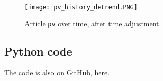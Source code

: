 \documentclass[oneside,10pt]{book}
\begin{document}
\begin{figure}[H]
\centering
\texttt{[image: pv\_history\_detrend.PNG]}
\caption{Article \texttt{pv} over time, after time adjustment}
\label{fig:z0m4rgv098cz}
\end{figure}











\subsection{Python code}\label{vinigold}

% 
The code is also on GitHub, \href{https://github.com/VincentGranville/Statistical-Optimization/blob/main/nlp_scoring.py}{here}. 
\vspace{1ex}
\end{document}
